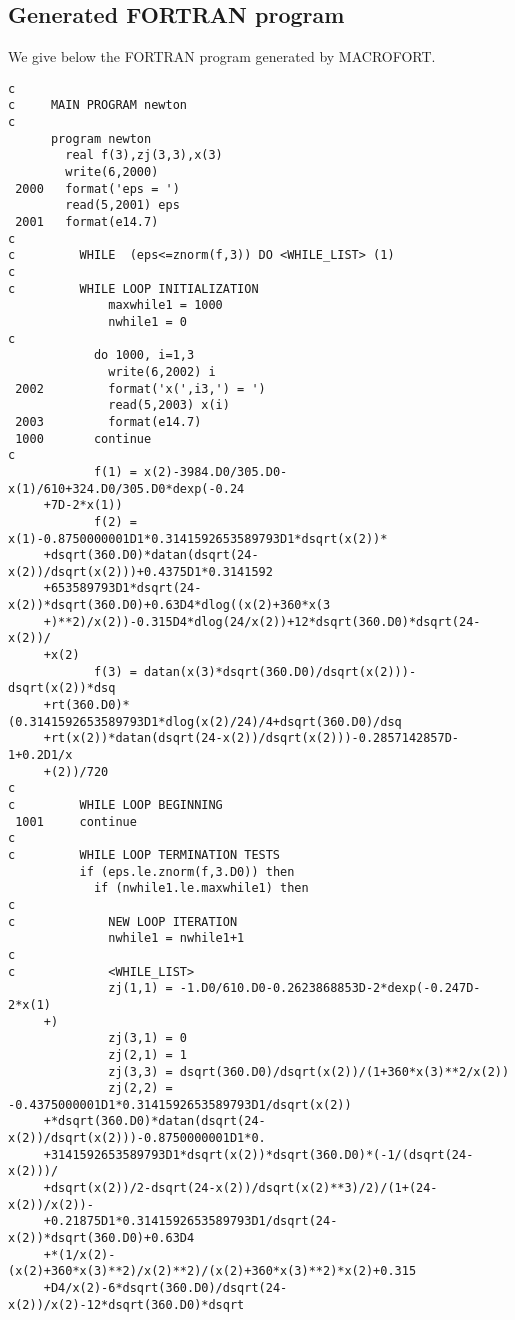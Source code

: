 \subsection{Generated FORTRAN program}

We give below the FORTRAN program generated by MACROFORT.

\begin{verbatim}
c      
c     MAIN PROGRAM newton
c      
      program newton
        real f(3),zj(3,3),x(3)
        write(6,2000) 
 2000   format('eps = ')
        read(5,2001) eps
 2001   format(e14.7)
c          
c         WHILE  (eps<=znorm(f,3)) DO <WHILE_LIST> (1)
c          
c         WHILE LOOP INITIALIZATION
              maxwhile1 = 1000
              nwhile1 = 0
c             
            do 1000, i=1,3
              write(6,2002) i
 2002         format('x(',i3,') = ')
              read(5,2003) x(i)
 2003         format(e14.7)
 1000       continue
c           
            f(1) = x(2)-3984.D0/305.D0-x(1)/610+324.D0/305.D0*dexp(-0.24
     +7D-2*x(1))
            f(2) = x(1)-0.8750000001D1*0.3141592653589793D1*dsqrt(x(2))*
     +dsqrt(360.D0)*datan(dsqrt(24-x(2))/dsqrt(x(2)))+0.4375D1*0.3141592
     +653589793D1*dsqrt(24-x(2))*dsqrt(360.D0)+0.63D4*dlog((x(2)+360*x(3
     +)**2)/x(2))-0.315D4*dlog(24/x(2))+12*dsqrt(360.D0)*dsqrt(24-x(2))/
     +x(2)
            f(3) = datan(x(3)*dsqrt(360.D0)/dsqrt(x(2)))-dsqrt(x(2))*dsq
     +rt(360.D0)*(0.3141592653589793D1*dlog(x(2)/24)/4+dsqrt(360.D0)/dsq
     +rt(x(2))*datan(dsqrt(24-x(2))/dsqrt(x(2)))-0.2857142857D-1+0.2D1/x
     +(2))/720
c          
c         WHILE LOOP BEGINNING
 1001     continue
c          
c         WHILE LOOP TERMINATION TESTS
          if (eps.le.znorm(f,3.D0)) then
            if (nwhile1.le.maxwhile1) then
c              
c             NEW LOOP ITERATION
              nwhile1 = nwhile1+1
c              
c             <WHILE_LIST>
              zj(1,1) = -1.D0/610.D0-0.2623868853D-2*dexp(-0.247D-2*x(1)
     +)
              zj(3,1) = 0
              zj(2,1) = 1
              zj(3,3) = dsqrt(360.D0)/dsqrt(x(2))/(1+360*x(3)**2/x(2))
              zj(2,2) = -0.4375000001D1*0.3141592653589793D1/dsqrt(x(2))
     +*dsqrt(360.D0)*datan(dsqrt(24-x(2))/dsqrt(x(2)))-0.8750000001D1*0.
     +3141592653589793D1*dsqrt(x(2))*dsqrt(360.D0)*(-1/(dsqrt(24-x(2)))/
     +dsqrt(x(2))/2-dsqrt(24-x(2))/dsqrt(x(2)**3)/2)/(1+(24-x(2))/x(2))-
     +0.21875D1*0.3141592653589793D1/dsqrt(24-x(2))*dsqrt(360.D0)+0.63D4
     +*(1/x(2)-(x(2)+360*x(3)**2)/x(2)**2)/(x(2)+360*x(3)**2)*x(2)+0.315
     +D4/x(2)-6*dsqrt(360.D0)/dsqrt(24-x(2))/x(2)-12*dsqrt(360.D0)*dsqrt

\end{verbatim}
